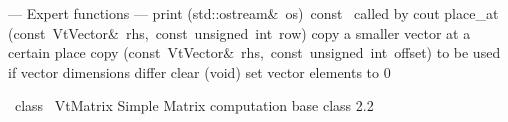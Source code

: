 \documentclass{article}
\begin{document}
\begin{cxxentry}
\begin{cxxclass}
\begin{cxxpublic}
\cxxitem{}
        {--- Expert functions --- }
        {}
        {}
        {}
\label{cxx.2.1.32}
        {print}
        {(std::ostream\&\ os)\ const\ }
        { called by cout}
        {}
\label{cxx.2.1.33}
        {place\_at}
        {(const\ VtVector\&\ rhs,\ const\ unsigned\ int\ row)}
        { copy a smaller vector at a certain place}
        {}
\label{cxx.2.1.34}
        {copy}
        {(const\ VtVector\&\ rhs,\ const\ unsigned\ int\ offset)}
        { to be used if vector dimensions differ}
        {}
\label{cxx.2.1.35}
        {clear}
        {(void)}
        { set vector elements to 0}
        {}
\label{cxx.2.1.36}
\end{cxxpublic}
\end{cxxclass}
\begin{cxxclass}
{\ class\ }
        {VtMatrix}
        {}
        {Simple Matrix computation base class}
        {2.2}
\begin{cxxInheritance}

\end{cxxInheritance}
\end{cxxclass}
\end{cxxentry}
\end{document}
